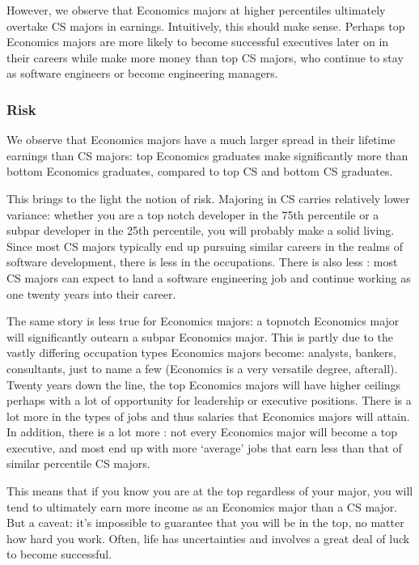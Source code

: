 \documentclass[letterpaper,10pt,english]{jupyterBook}
\begin{document}
\sphinxAtStartPar
However, we observe that Economics majors at higher percentiles ultimately overtake CS majors in earnings. Intuitively, this should make sense. Perhaps top Economics majors are more likely to become successful executives later on in their careers while make more money than top CS majors, who continue to stay as software engineers or become engineering managers.


\subsubsection{Risk}
\label{\detokenize{content/00-intro/index:risk}}
\sphinxAtStartPar
We observe that Economics majors have a much larger spread in their lifetime earnings than CS majors: top Economics graduates make significantly more than bottom Economics graduates, compared to top CS and bottom CS graduates.

\sphinxAtStartPar
This brings to the light the notion of risk. Majoring in CS carries relatively lower variance: whether you are
a top notch developer in the 75th percentile or a subpar developer in the 25th percentile, you will probably make a solid living. Since most CS majors typically end up pursuing similar careers in the realms of software development, there is less  in the occupations. There is also less : most CS majors can expect to land a software engineering job and continue working as one twenty years into their career.

\sphinxAtStartPar
The same story is less true for Economics majors: a top\sphinxhyphen{}notch Economics major will significantly out\sphinxhyphen{}earn a subpar Economics major. This is partly due to the vastly differing occupation types Economics majors become: analysts, bankers, consultants, just to name a few (Economics is a very versatile degree, afterall). Twenty years down the line, the top Economics majors will have higher ceilings perhaps with a lot of opportunity for leadership or executive positions. There is a lot more  in the types of jobs and thus salaries that Economics majors will attain. In addition, there is a lot more : not every Economics major will become a top executive, and most end up with more ‘average’ jobs that earn less than that of similar percentile CS majors.

\sphinxAtStartPar
This means that if you know you are at the top regardless of your major, you will tend to ultimately earn more income as an Economics major than a CS major. But a caveat: it’s impossible to guarantee that you will be in the top, no matter how hard you work. Often, life has uncertainties and involves a great deal of luck to become successful.
\end{document}
